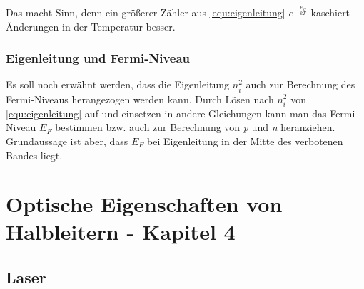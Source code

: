 \documentclass{article}
\begin{document}
    Das macht Sinn, denn ein größerer Zähler aus \autoref{equ:eigenleitung} $e^{-\frac{E_G}{kT}}$ kaschiert Änderungen in der Temperatur besser.
    
    \subsubsection{Eigenleitung und Fermi-Niveau}
    Es soll noch erwähnt werden, dass die Eigenleitung $n_i^2$ auch zur Berechnung des Fermi-Niveaus herangezogen werden kann.
    Durch Lösen nach $n_i^2$ von \autoref{equ:eigenleitung} auf und einsetzen in andere Gleichungen kann man das Fermi-Niveau $E_F$ bestimmen bzw. auch zur Berechnung von \textit{p} und \textit{n} heranziehen. 
    Grundaussage ist aber, dass $E_F$ bei Eigenleitung in der Mitte des verbotenen Bandes liegt.
    
\section{Optische Eigenschaften von Halbleitern - Kapitel 4}

\subsection{Laser }\label{k4:laser}
\end{document}
